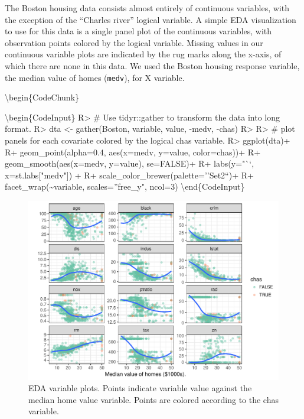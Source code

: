 \documentclass[article]{jss}
\begin{document}
The Boston housing data consists almost entirely of continuous
variables, with the exception of the ``Charles river'' logical variable.
A simple EDA visualization to use for this data is a single panel plot
of the continuous variables, with observation points colored by the
logical variable. Missing values in our continuous variable plots are
indicated by the rug marks along the x-axis, of which there are none in
this data. We used the Boston housing response variable, the median
value of homes (\texttt{medv}), for X variable.

\textbackslash{}begin\{CodeChunk\}

\textbackslash{}begin\{CodeInput\} R\textgreater{} \# Use tidyr::gather
to transform the data into long format. R\textgreater{} dta \textless{}-
gather(Boston, variable, value, -medv, -chas) R\textgreater{}
R\textgreater{} \# plot panels for each covariate colored by the logical
chas variable. R\textgreater{} ggplot(dta)+ R+ geom\_point(alpha=0.4,
aes(x=medv, y=value, color=chas))+ R+ geom\_smooth(aes(x=medv, y=value),
se=FALSE)+ R+ labs(y="``, x=st.labs{[}"medv"{]}) + R+
scale\_color\_brewer(palette=''Set2``)+ R+
facet\_wrap(\textasciitilde{}variable, scales=''free\_y", ncol=3)
\textbackslash{}end\{CodeInput\}

\begin{figure}

{\centering \includegraphics{Regression-rfsrc_files/figure-latex/eda-1} 

}

\caption[EDA variable plots]{EDA variable plots. Points indicate variable value against the median home value variable. Points are colored according to the chas variable.}\label{fig:eda}
\end{figure}
\end{document}
